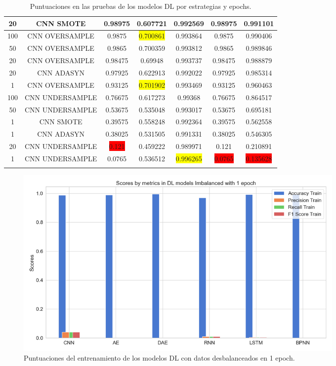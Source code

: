 \begin{longtable}{|c|c|c|c|c|c|c|}
	20 & CNN SMOTE & 0.98975 & 0.607721 & 0.992569 & 0.98975 & 0.991101\\ \hline
	100 & CNN OVERSAMPLE & 0.9875 & \colorbox{yellow}{0.700861} & 0.993864 & 0.9875 & 0.990406\\ \hline
	50 & CNN OVERSAMPLE & 0.9865 & 0.700359 & 0.993812 & 0.9865 & 0.989846\\ \hline
	20 & CNN OVERSAMPLE & 0.98475 & 0.69948 & 0.993737 & 0.98475 & 0.988879\\ \hline
	20 & CNN ADASYN & 0.97925 & 0.622913 & 0.992022 & 0.97925 & 0.985314\\ \hline
	1 & CNN OVERSAMPLE & 0.93125 & \colorbox{yellow}{0.701902} & 0.993469 & 0.93125 & 0.960463\\ \hline
	100 & CNN UNDERSAMPLE & 0.76675 & 0.617273 & 0.99368 & 0.76675 & 0.864517\\ \hline
	50 & CNN UNDERSAMPLE & 0.53675 & 0.535048 & 0.993017 & 0.53675 & 0.695181\\ \hline
	1 & CNN SMOTE & 0.39575 & 0.558248 & 0.992364 & 0.39575 & 0.562558\\ \hline
	1 & CNN ADASYN & 0.38025 & 0.531505 & 0.991331 & 0.38025 & 0.546305\\ \hline
	20 & CNN UNDERSAMPLE & \colorbox{red}{0.121} & 0.459222 & 0.989971 & 0.121 & 0.210891\\ \hline
	1 & CNN UNDERSAMPLE & 0.0765 & 0.536512 & \colorbox{yellow}{0.996265} & \colorbox{red}{0.0765} & \colorbox{red}{0.135628}\\ \hline
	\caption{Puntuaciones en las pruebas de los modelos DL por estrategias y epochs.}
	\label{an:6}
\end{longtable}

\begin{figure}[h!]
	\centering
	\includegraphics[width=0.8\textwidth]{"figuras/Experimento5/Imbalanced/DL_imbalanced_1_train"}
	\caption{Puntuaciones del entrenamiento de los modelos DL con datos desbalanceados en 1 epoch.}
	\label{an:7}
\end{figure}

